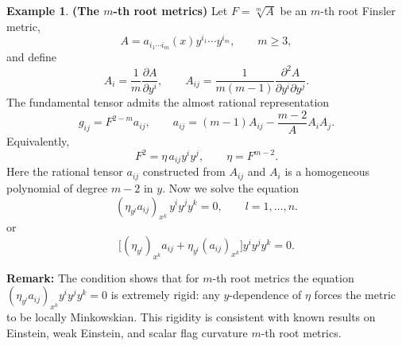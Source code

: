 \documentclass[12pt]{article}
\theoremstyle{definition}
\newtheorem{example}[theorem]{Example}
\begin{document}
						
						
						
						\begin{example}\textbf{(The \(m\)-th root metrics)} \textnormal{ Let \(F=\sqrt[m]{A}\) be an \(m\)-th root Finsler metric,}
							\[
							A=a_{i_1\cdots i_m}(x)y^{i_1}\cdots y^{i_m},\qquad m\ge3,
							\]
							and define
							\[
							A_i=\frac{1}{m}\frac{\partial A}{\partial y^i},\qquad
							A_{ij}=\frac{1}{m(m-1)}\frac{\partial^2 A}{\partial y^i\partial y^j}.
							\]
							\textnormal{The fundamental tensor admits the almost rational representation}
							\[
							g_{ij}=F^{2-m}a_{ij},
							\qquad
							a_{ij}=(m-1)A_{ij}-\frac{m-2}{A}A_iA_j.
							\]
							Equivalently,
							\[
							F^2=\eta\,a_{ij}y^iy^j,
							\qquad
							\eta=F^{m-2}.
							\]
							\textnormal{Here the rational tensor \(a_{ij}\)
								constructed from \(A_{ij}\) and \(A_i\) is a homogeneous polynomial of degree \(m-2\) in \(y\). Now we solve the equation}
								\begin{equation}\label{eq:mroot-main}
								(\eta_{y^l}a_{ij})_{x^k}\,y^i y^j y^k=0,
								\qquad l=1,\dots,n.
								\end{equation} or
								\begin{equation}\label{eq:mroot-expanded}
								\Big[(\eta_{y^l})_{x^k}a_{ij}
								+\eta_{y^l}(a_{ij})_{x^k}\Big]y^i y^j y^k=0.
								\end{equation}
							\end{example}
							
							
							\textbf{Remark:}
							The condition shows that for \(m\)-th root metrics the equation
							\((\eta_{y^l}a_{ij})_{x^k}y^iy^jy^k=0\) is extremely rigid:
							any \(y\)-dependence of \(\eta\) forces the metric to be locally Minkowskian.
							This rigidity is consistent with known results on Einstein, weak Einstein, and scalar flag curvature \(m\)-th root metrics.
							
							
							
\end{document}
